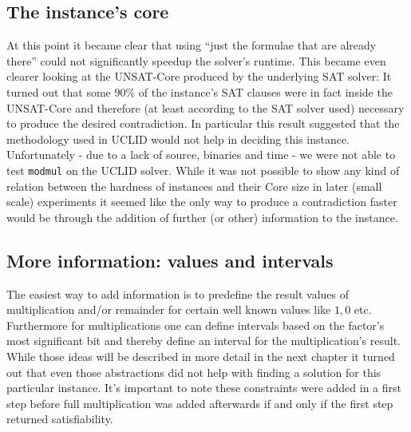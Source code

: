 \subsection{The instance's core}
At this point it became clear that using \enquote{just the formulae that are already there} could not significantly speedup the solver's runtime. This became even clearer looking at the UNSAT-Core produced by the underlying SAT solver: It turned out that some $90\%$ of the instance's SAT clauses were in fact inside the UNSAT-Core and therefore (at least according to the SAT solver used) necessary to produce the desired contradiction.
In particular this result suggested that the methodology used in UCLID \cite{Bryant2007_Chapter_DecidingBit-VectorArithmeticWi-UCLID} would not help in deciding this instance.
Unfortunately - due to a lack of source, binaries and time - we were not able to test \texttt{modmul} on the UCLID solver.
While it was not possible to show any kind of relation between the hardness of instances and their Core size in later (small scale) experiments it seemed like the only way to produce a contradiction faster would be through the addition of further (or other) information to the instance.

\subsection{More information: values and intervals}
The easiest way to add information is to predefine the result values of multiplication and/or remainder for certain well known values like $1,0$ etc. Furthermore for multiplications one can define intervals based on the  factor's most significant bit and thereby define an interval for the multiplication's result. While those ideas will be described in more detail in the next chapter it turned out that even those abstractions did not help with finding a solution for this particular instance. It's important to note these constraints were added in a first step before full multiplication was added afterwards if and only if the first step returned satisfiability.

